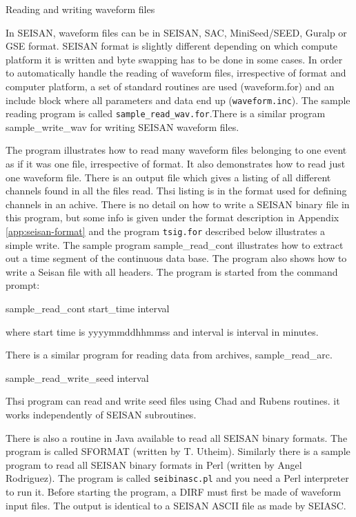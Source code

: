 Reading %
and writing 
waveform files 

In SEISAN, waveform files can be in SEISAN, SAC, MiniSeed/SEED, Guralp  or 
GSE format. SEISAN format is slightly different depending on which 
compute platform it is written and byte swapping has to be done in 
some cases. In order to automatically handle the reading of waveform 
files, irrespective of format and computer platform, a set of standard 
routines are used (waveform.for) and an include block where all 
parameters and data end up (\texttt{waveform.inc}). 
The sample %
reading 
program 
is called \texttt{sample\_read\_wav.for}.There is a similar program sample\_write\_wav for writing SEISAN waveform files. 

The program illustrates how to read many waveform files belonging 
to one event as if it was one file, irrespective of format. It also 
demonstrates how to read just one waveform file. There is an output file which gives a listing of all different channels found in all the files read. Thsi listing is in the format used for defining channels in an achive.  There is no detail 
on how to write a SEISAN binary file in this program, but some info 
is given under the format description in Appendix 
\ref{app:seisan-format} 
and the program \texttt{tsig.for} described below illustrates a simple write. 
The sample program sample\_read\_cont illustrates how to 
extract out a time segment of the continuous data base. The program 
also shows how to write a Seisan file with all headers. The program 
is started from the command prompt: 

sample\_read\_cont start\_time interval 

where start time is yyyymmddhhmmss and interval is interval in minutes. 

There is a similar program for reading data from archives, sample\_read\_arc. 

sample\_read\_write\_seed interval

Thsi program can read and write seed files using Chad and Rubens routines. it works independently of SEISAN subroutines.

 There is also a routine in Java available 
to read all SEISAN binary formats. The program is called SFORMAT 
 (written by T. Utheim). Similarly there 
is a sample program to read all SEISAN binary formats in Perl 
(written by Angel Rodriguez). The program is called 
\texttt{seibinasc.pl} and you need a Perl interpreter to run it. 
Before starting the program, a DIRF must first be made of waveform 
input files. The output is identical to a SEISAN ASCII file as 
made by SEIASC.  

